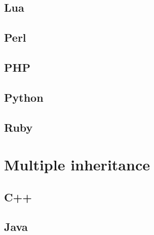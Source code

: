 \documentclass{KodeBook}
\begin{document}
\subsection{Lua}


\subsection{Perl}


\subsection{PHP}


\subsection{Python}


\subsection{Ruby}




\section{Multiple inheritance}

\subsection{C++}


\subsection{Java}
\end{document}
